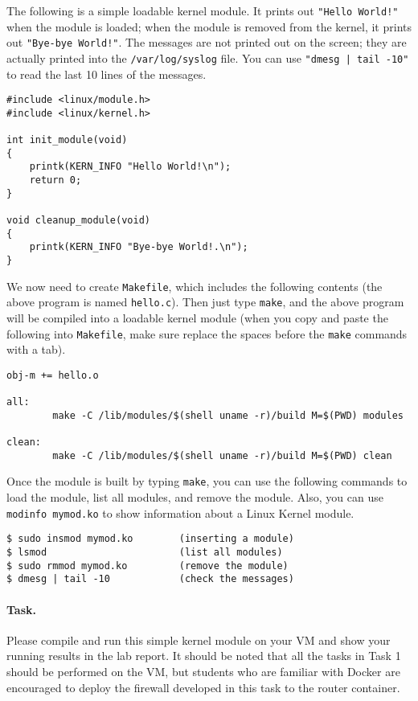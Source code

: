 The following is a simple loadable kernel module. It prints out 
\texttt{"Hello World!"} when the module is loaded; when the module
is removed from the kernel, it prints out \texttt{"Bye-bye World!"}.
The messages are not printed out on the screen; they are 
actually printed into the \texttt{/var/log/syslog} file. You can
use \texttt{"dmesg | tail -10"} to read the last 10 lines of 
the messages. 


\begin{lstlisting}
#include <linux/module.h>
#include <linux/kernel.h>

int init_module(void)
{
    printk(KERN_INFO "Hello World!\n");
    return 0;
}

void cleanup_module(void)
{
    printk(KERN_INFO "Bye-bye World!.\n");
}
\end{lstlisting}

We now need to create {\tt Makefile}, which includes the following
contents (the above program is named {\tt hello.c}). Then 
just type {\tt make}, and the above program will be compiled
into a loadable kernel module (when you copy and paste the following
into \texttt{Makefile}, make sure replace the spaces before the 
\texttt{make} commands with a tab).


\begin{lstlisting}
obj-m += hello.o

all:
        make -C /lib/modules/$(shell uname -r)/build M=$(PWD) modules

clean:
        make -C /lib/modules/$(shell uname -r)/build M=$(PWD) clean
\end{lstlisting}


Once the module is built by typing {\tt make}, you can use the following commands to 
load the module, list all modules, and remove the module. 
Also, you can use {\tt modinfo mymod.ko} to show information about a 
Linux Kernel module.

\begin{lstlisting}
$ sudo insmod mymod.ko        (inserting a module)
$ lsmod                       (list all modules)
$ sudo rmmod mymod.ko         (remove the module)
$ dmesg | tail -10            (check the messages)
\end{lstlisting}


\paragraph{Task.} Please compile and run this simple kernel module on 
your VM and show your running results in the lab report. 
It should be noted that all the tasks in Task 1 should be 
performed on the VM, but students who are familiar with Docker
are encouraged to deploy the firewall developed in this task
to the router container. 


